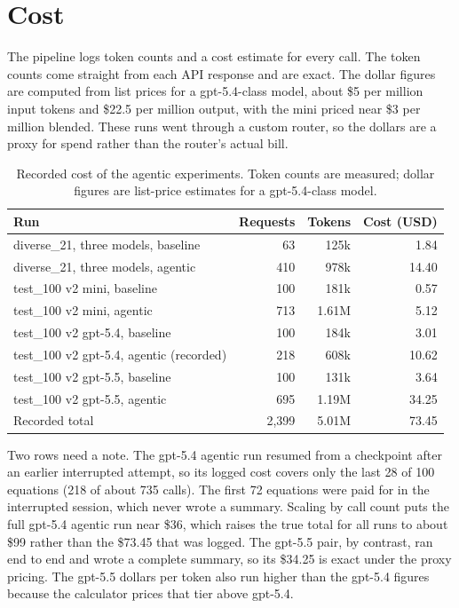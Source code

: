 \documentclass[11pt]{article}
\begin{document}
\section{Cost}
The pipeline logs token counts and a cost estimate for every call. The token
counts come straight from each API response and are exact. The dollar figures
are computed from list prices for a gpt-5.4-class model, about \$5 per million
input tokens and \$22.5 per million output, with the mini priced near \$3 per
million blended. These runs went through a custom router, so the dollars are a
proxy for spend rather than the router's actual bill.

\begin{table}[h]
\centering
\caption{Recorded cost of the agentic experiments. Token counts are measured;
dollar figures are list-price estimates for a gpt-5.4-class model.}
\begin{tabular}{lrrr}
\toprule
Run & Requests & Tokens & Cost (USD) \\
\midrule
diverse\_21, three models, baseline        & 63  & 125k  & 1.84 \\
diverse\_21, three models, agentic         & 410 & 978k  & 14.40 \\
test\_100 v2 mini, baseline                & 100 & 181k  & 0.57 \\
test\_100 v2 mini, agentic                 & 713 & 1.61M & 5.12 \\
test\_100 v2 gpt-5.4, baseline             & 100 & 184k  & 3.01 \\
test\_100 v2 gpt-5.4, agentic (recorded)   & 218 & 608k  & 10.62 \\
test\_100 v2 gpt-5.5, baseline             & 100 & 131k  & 3.64 \\
test\_100 v2 gpt-5.5, agentic              & 695 & 1.19M & 34.25 \\
\midrule
Recorded total                             & 2{,}399 & 5.01M & 73.45 \\
\bottomrule
\end{tabular}
\end{table}

Two rows need a note. The gpt-5.4 agentic run resumed from a checkpoint after
an earlier interrupted attempt, so its logged cost covers only the last 28 of
100 equations (218 of about 735 calls). The first 72 equations were paid for in
the interrupted session, which never wrote a summary. Scaling by call count puts
the full gpt-5.4 agentic run near \$36, which raises the true total for all runs
to about \$99 rather than the \$73.45 that was logged. The gpt-5.5 pair, by
contrast, ran end to end and wrote a complete summary, so its \$34.25 is exact
under the proxy pricing. The gpt-5.5 dollars per token also run higher than the
gpt-5.4 figures because the calculator prices that tier above gpt-5.4.
\end{document}
